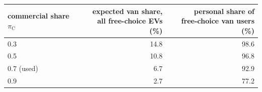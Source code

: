 \begin{tabular}{lrr}\toprule
commercial share $\pi_{\mathrm{C}}$ & \shortstack{expected van share,\\all free-choice EVs (\%)} & \shortstack{personal share of\\free-choice van users (\%)} \\ \midrule
0.3 & 14.8 & 98.6 \\
0.5 & 10.8 & 96.8 \\
0.7 (used) & 6.7 & 92.9 \\
0.9 & 2.7 & 77.2 \\
\bottomrule\end{tabular}
